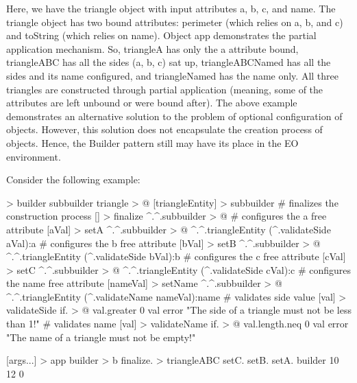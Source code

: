\documentclass[12pt]{book}
\begin{document}
Here, we have the triangle object with input attributes a, b, c, and name. The triangle object has two bound attributes: perimeter (which relies on a, b, and c) and toString (which relies on name). Object app demonstrates the partial application mechanism. So, triangleA has only the a attribute bound, triangleABC has all the sides (a, b, c) sat up, triangleABCNamed has all the sides and its name configured, and triangleNamed has the name only. All three triangles are constructed through partial application (meaning, some of the attributes are left unbound or were bound after). The above example demonstrates an alternative solution to the problem of optional configuration of objects. However, this solution does not encapsulate the creation process of objects. Hence, the Builder pattern still may have its place in the EO environment.

Consider the following example:

\begin{ffcode}
[] > builder
  subbuilder triangle > @
  [triangleEntity] > subbuilder
    # finalizes the construction process
    [] > finalize
      ^.^.subbuilder > @
    # configures the a free attribute
    [aVal] > setA
      ^.^.subbuilder > @
        ^.^.triangleEntity
          (^.validateSide aVal):a
    # configures the b free attribute
    [bVal] > setB
      ^.^.subbuilder > @
        ^.^.triangleEntity
          (^.validateSide bVal):b
    # configures the c free attribute
    [cVal] > setC
      ^.^.subbuilder > @
        ^.^.triangleEntity
          (^.validateSide cVal):c
    # configures the name free attribute
    [nameVal] > setName
      ^.^.subbuilder > @
        ^.^.triangleEntity
          (^.validateName nameVal):name
    # validates side value
    [val] > validateSide
      if. > @
        val.greater 0
        val
        error
          "The side of a triangle must not 
          be less than 1!"
    # validates name
    [val] > validateName
      if. > @
        val.length.neq 0
        val
        error
          "The name of a triangle must not be empty!"

[args...] > app
  builder > b
  finalize. > triangleABC
    setC.
      setB.
        setA.
          builder
          10
        12
      0

\end{ffcode}
\end{document}
